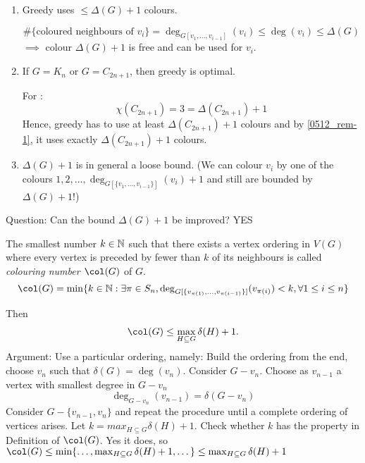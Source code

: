 \documentclass[aagt.tex]{subfiles}
\begin{document}
\begin{rem}
  \begin{enumerate}
    \item \label{0512_rem-1} Greedy uses $\leq \Delta(G) + 1$ colours. 
    
    \[ \# \{\text{coloured neighbours of }v_i \} = \deg_{G[v_1,\dots,v_{i-1}]}(v_i) \leq \deg(v_i) \leq \Delta(G) \]
    $\implies$ colour $\Delta(G) + 1$ is free and can be used for $v_i$.
    \item If $G = K_n$ or $G = C_{2n+1}$, then greedy is optimal.
    
    For :
    \[ \chi(C_{2n+1}) = 3 = \Delta(C_{2n+1}) + 1 \]
    Hence, greedy has to use at least $\Delta(C_{2n+1}) + 1$ colours and by \ref{0512_rem-1}, it uses exactly $\Delta(C_{2n+1})+1$ colours.
    \item $\Delta(G) +1$ is in general a loose bound. 
    (We can colour $v_i$ by one of the colours $1,2,\dots,\deg_{G[\{v_1,\dots,v_{i-1}\}]}(v_i) + 1$ and still are bounded by $\Delta(G) +1$!)
  \end{enumerate}
\end{rem}

Question: Can the bound $\Delta(G) +1$ be improved? YES

\begin{defi*}
  The smallest number $k \in \mathbb{N}$ such that there exists a vertex ordering in $V(G)$ where every vertex is preceded by fewer than $k$ of its neighbours is called \emph{colouring number $\col(G)$} of $G$.
  \[ \col(G) = \min \{ k \in \N: \exists \pi \in S_n, \deg_{G[\{v_{\pi(1)},\dots,v_{\pi(i-1)}\}]} (v_{\pi(i)}) < k, \forall 1 \leq i \leq n \} \]
\end{defi*}

Then 
\begin{align}\label{0512_star1}
  \col(G) \leq \max_{H \subseteq G} \delta(H) + 1 \text{.}
\end{align}
Argument: Use a particular ordering, namely:
Build the ordering from the end, choose $v_n$ such that $\delta(G) = \deg(v_n)$.
Consider $G - v_n$. Choose as $v_{n-1}$ a vertex with smallest degree in $G - v_n$
\[ \deg_{G-v_n}(v_{n-1}) = \delta(G-v_n) \]
Consider $G - \{v_{n-1},v_n\}$ and repeat the procedure until a complete ordering of vertices arises.
Let $k = max_{H \subseteq G} \delta(H)+1$. Check whether $k$ has the property in Definition of $\col(G)$.
Yes it does, so $\col(G) \leq \min \{ \dots, \max_{H \subseteq G} \delta(H)+1,\dots \} \leq \max_{H \subseteq G} \delta(H)+1$
\end{document}
